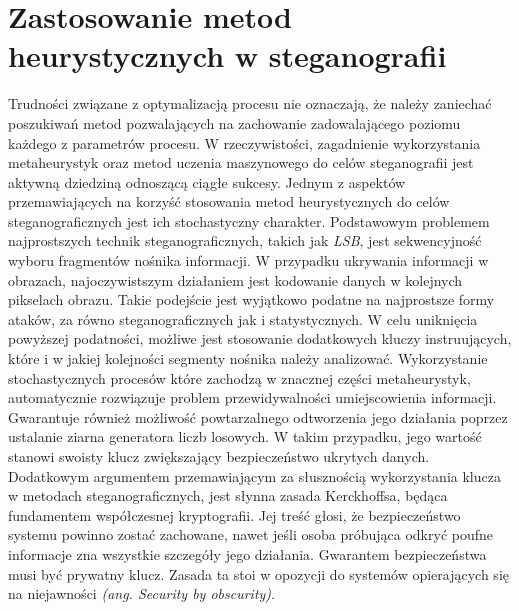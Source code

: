 {    %
    \section{Zastosowanie metod heurystycznych w steganografii}
    {
        Trudności związane z optymalizacją procesu nie oznaczają, że należy zaniechać poszukiwań metod pozwalających na
        zachowanie zadowalającego poziomu każdego z parametrów procesu. W rzeczywistości, zagadnienie wykorzystania
        metaheurystyk oraz metod uczenia maszynowego do celów steganografii jest aktywną dziedziną odnoszącą ciągłe
        sukcesy\cite{ElEmam2013NewSA, Zhao2021AntCO, Khan2018AntCO, Saleema2016ANS, Li2007ASM}.
        Jednym z aspektów przemawiających na korzyść stosowania metod heurystycznych do celów steganograficznych jest
        ich stochastyczny charakter. Podstawowym problemem najprostszych technik steganograficznych, takich jak
        \textit{LSB}, jest sekwencyjność wyboru fragmentów nośnika informacji. W przypadku ukrywania informacji w
        obrazach, najoczywistszym działaniem jest kodowanie danych w kolejnych pikselach obrazu. Takie podejście jest
        wyjątkowo podatne na najprostsze formy ataków, za równo steganograficznych jak i statystycznych. W celu
        uniknięcia powyższej podatności, możliwe jest stosowanie dodatkowych kluczy instruujących, które i w jakiej
        kolejności segmenty nośnika należy analizować\cite{AlHusainy2019ASI}. Wykorzystanie stochastycznych procesów
        które zachodzą w znacznej części metaheurystyk, automatycznie rozwiązuje problem przewidywalności umiejscowienia
        informacji. Gwarantuje również możliwość powtarzalnego odtworzenia jego działania poprzez ustalanie ziarna
        generatora liczb losowych. W takim przypadku, jego wartość stanowi swoisty klucz zwiększający bezpieczeństwo
        ukrytych danych.
        Dodatkowym argumentem przemawiającym za słusznością wykorzystania klucza w metodach steganograficznych, jest
        słynna zasada Kerckhoffsa\cite{Guillot2013AugusteKE}, będąca fundamentem współczesnej kryptografii. Jej treść
        głosi, że bezpieczeństwo systemu powinno zostać zachowane, nawet jeśli osoba próbująca odkryć poufne informacje
        zna wszystkie szczegóły jego działania. Gwarantem bezpieczeństwa musi być prywatny klucz. Zasada ta stoi w
        opozycji do systemów opierających się na niejawności \textit{(ang. Security by obscurity)}.

}}

